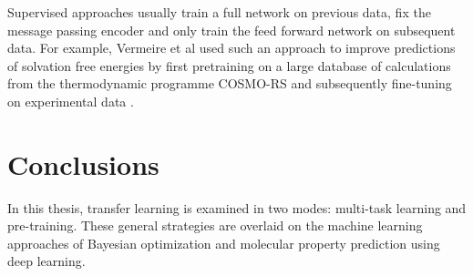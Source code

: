 Supervised approaches usually train a full network on previous data, fix the message passing encoder and only train the feed forward network on subsequent data. For example, Vermeire et al used such an approach to improve predictions of solvation free energies by first pretraining on a large database of calculations from the thermodynamic programme COSMO-RS and subsequently fine-tuning on experimental data \cite{Vermeire2021}. 

\section{Conclusions}

In this thesis, transfer learning is examined in two modes: multi-task learning and pre-training. These general strategies are overlaid on the machine learning approaches of Bayesian optimization and molecular property prediction using deep learning. 